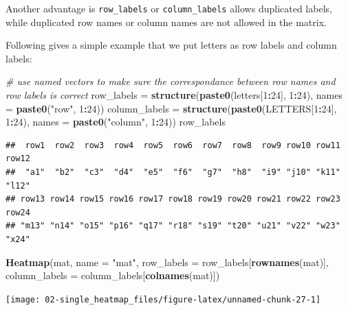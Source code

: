 \documentclass[]{book}
\newenvironment{Shaded}{\begin{snugshade}}{\end{snugshade}}
\newcommand{\KeywordTok}[1]{\textcolor[rgb]{0.13,0.29,0.53}{\textbf{#1}}}
\newcommand{\DataTypeTok}[1]{\textcolor[rgb]{0.13,0.29,0.53}{#1}}
\newcommand{\DecValTok}[1]{\textcolor[rgb]{0.00,0.00,0.81}{#1}}
\newcommand{\StringTok}[1]{\textcolor[rgb]{0.31,0.60,0.02}{#1}}
\newcommand{\CommentTok}[1]{\textcolor[rgb]{0.56,0.35,0.01}{\textit{#1}}}
\newcommand{\OperatorTok}[1]{\textcolor[rgb]{0.81,0.36,0.00}{\textbf{#1}}}
\newcommand{\NormalTok}[1]{#1}
\theoremstyle{definition}
\theoremstyle{definition}
\theoremstyle{definition}
\theoremstyle{remark}
\begin{document}
Another advantage is \texttt{row\_labels} or \texttt{column\_labels}
allows duplicated labels, while duplicated row names or column names are
not allowed in the matrix.

Following gives a simple example that we put letters as row labels and
column labels:

\begin{Shaded}
\begin{Highlighting}[]
\CommentTok{# use named vectors to make sure the correspondance between row names and row labels is correct}
\NormalTok{row_labels =}\StringTok{ }\KeywordTok{structure}\NormalTok{(}\KeywordTok{paste0}\NormalTok{(letters[}\DecValTok{1}\OperatorTok{:}\DecValTok{24}\NormalTok{], }\DecValTok{1}\OperatorTok{:}\DecValTok{24}\NormalTok{), }\DataTypeTok{names =} \KeywordTok{paste0}\NormalTok{(}\StringTok{"row"}\NormalTok{, }\DecValTok{1}\OperatorTok{:}\DecValTok{24}\NormalTok{))}
\NormalTok{column_labels =}\StringTok{ }\KeywordTok{structure}\NormalTok{(}\KeywordTok{paste0}\NormalTok{(LETTERS[}\DecValTok{1}\OperatorTok{:}\DecValTok{24}\NormalTok{], }\DecValTok{1}\OperatorTok{:}\DecValTok{24}\NormalTok{), }\DataTypeTok{names =} \KeywordTok{paste0}\NormalTok{(}\StringTok{"column"}\NormalTok{, }\DecValTok{1}\OperatorTok{:}\DecValTok{24}\NormalTok{))}
\NormalTok{row_labels}
\end{Highlighting}
\end{Shaded}

\begin{verbatim}
##  row1  row2  row3  row4  row5  row6  row7  row8  row9 row10 row11 row12 
##  "a1"  "b2"  "c3"  "d4"  "e5"  "f6"  "g7"  "h8"  "i9" "j10" "k11" "l12" 
## row13 row14 row15 row16 row17 row18 row19 row20 row21 row22 row23 row24 
## "m13" "n14" "o15" "p16" "q17" "r18" "s19" "t20" "u21" "v22" "w23" "x24"
\end{verbatim}

\begin{Shaded}
\begin{Highlighting}[]
\KeywordTok{Heatmap}\NormalTok{(mat, }\DataTypeTok{name =} \StringTok{"mat"}\NormalTok{, }\DataTypeTok{row_labels =}\NormalTok{ row_labels[}\KeywordTok{rownames}\NormalTok{(mat)], }
    \DataTypeTok{column_labels =}\NormalTok{ column_labels[}\KeywordTok{colnames}\NormalTok{(mat)])}
\end{Highlighting}
\end{Shaded}

\begin{center}\texttt{[image: 02-single\_heatmap\_files/figure-latex/unnamed-chunk-27-1]} \end{center}
\end{document}
